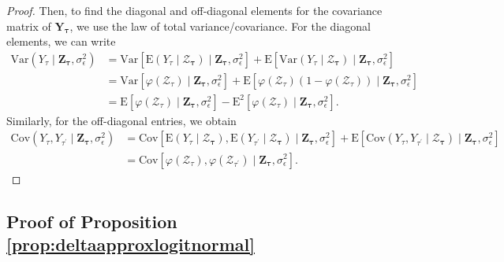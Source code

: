 \begin{proof}
 
Then, to find the diagonal and off-diagonal elements for the covariance matrix 
of $\mathbf{Y}_{\boldsymbol{\tau}}$, we use the law of total variance/covariance. 
For the diagonal elements, we can write
\begin{equation*}
    \begin{split}
        \text{Var}(Y_{\tau}\mid\mathbf{Z}_{\boldsymbol{\tau}},\sigma_{\epsilon}^2)&=\text{Var}[\text{E}(Y_{\tau}\mid \mathcal{Z}_{\boldsymbol{\tau}})\mid\mathbf{Z}_{\boldsymbol{\tau}},\sigma_{\epsilon}^2]+\text{E}[\text{Var}(Y_{\tau}\mid \mathcal{Z}_{\boldsymbol{\tau}})\mid\mathbf{Z}_{\boldsymbol{\tau}},\sigma_{\epsilon}^2]\\
        &=\text{Var}[\varphi(\mathcal{Z}_{\tau})\mid\mathbf{Z}_{\boldsymbol{\tau}},\sigma_{\epsilon}^2]+\text{E}[\varphi(\mathcal{Z}_{\tau})(1-\varphi(\mathcal{Z}_{\tau}))\mid \mathbf{Z}_{\boldsymbol{\tau}},\sigma_{\epsilon}^2]\\
        &=\text{E}[\varphi(\mathcal{Z}_{\tau})\mid \mathbf{Z}_{\boldsymbol{\tau}},\sigma_{\epsilon}^2]-\text{E}^2[\varphi(\mathcal{Z}_{\tau})\mid \mathbf{Z}_{\boldsymbol{\tau}},\sigma_{\epsilon}^2].
    \end{split}
    \label{eq:varcondsignal}
\end{equation*}
Similarly, for the off-diagonal entries, we obtain
\begin{equation*}
    \begin{split}
        \text{Cov}(Y_{\tau},Y_{\tau^{\prime}}\mid\mathbf{Z}_{\boldsymbol{\tau}},\sigma_{\epsilon}^2)&=\text{Cov}[\text{E}(Y_{\tau}\mid \boldsymbol{\mathcal{Z}}_{\boldsymbol{\tau}}),\text{E}(Y_{\tau^{\prime}}\mid \boldsymbol{\mathcal{Z}}_{\boldsymbol{\tau}})\mid\mathbf{Z}_{\boldsymbol{\tau}},\sigma_{\epsilon}^2]+\text{E}[\text{Cov}(Y_{\tau},Y_{\tau^{\prime}}\mid \boldsymbol{\mathcal{Z}}_{\boldsymbol{\tau}})\mid\mathbf{Z}_{\boldsymbol{\tau}},\sigma_{\epsilon}^2]\\
        &=\text{Cov}[\varphi(\mathcal{Z}_{\tau}),\varphi(\mathcal{Z}_{\tau^{\prime}})\mid\mathbf{Z}_{\boldsymbol{\tau}},\sigma_{\epsilon}^2].
    \end{split}
    \label{eq:covcondsignal}
\end{equation*}
\end{proof}


\subsection*{Proof of Proposition \ref{prop:deltaapproxlogitnormal}}
\label{subsec:proofdeltaapprox}

